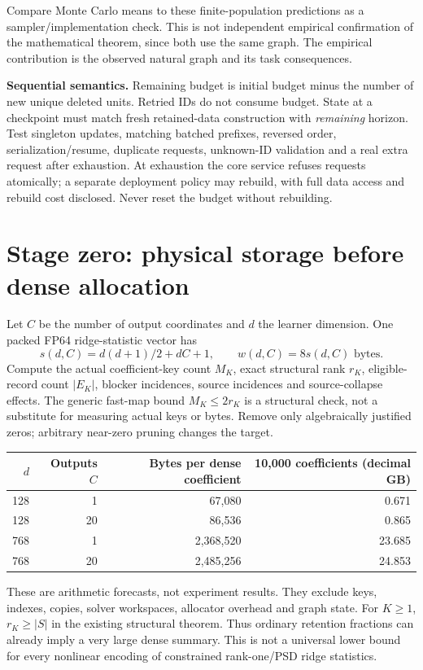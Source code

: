 \documentclass[11pt,a4paper]{article}
\newcommand{\smalltable}{\small\renewcommand{\arraystretch}{1.14}}
\begin{document}
Compare Monte Carlo means to these finite-population predictions as a sampler/implementation check. This is not independent empirical confirmation of the mathematical theorem, since both use the same graph. The empirical contribution is the observed natural graph and its task consequences.

\textbf{Sequential semantics.} Remaining budget is initial budget minus the number of new unique deleted units. Retried IDs do not consume budget. State at a checkpoint must match fresh retained-data construction with \emph{remaining} horizon. Test singleton updates, matching batched prefixes, reversed order, serialization/resume, duplicate requests, unknown-ID validation and a real extra request after exhaustion. At exhaustion the core service refuses requests atomically; a separate deployment policy may rebuild, with full data access and rebuild cost disclosed. Never reset the budget without rebuilding.

\section{Stage zero: physical storage before dense allocation}
Let $C$ be the number of output coordinates and $d$ the learner dimension. One packed FP64 ridge-statistic vector has
\[
 s(d,C)=d(d+1)/2+dC+1,\qquad w(d,C)=8s(d,C)\text{ bytes}.
\]
Compute the actual coefficient-key count $M_K$, exact structural rank $r_K$, eligible-record count $|E_K|$, blocker incidences, source incidences and source-collapse effects. The generic fast-map bound $M_K\le2r_K$ is a structural check, not a substitute for measuring actual keys or bytes. Remove only algebraically justified zeros; arbitrary near-zero pruning changes the target.

{\smalltable\begin{center}
\begin{tabular}{rrrr}
\toprule $d$ & Outputs $C$ & Bytes per dense coefficient & 10,000 coefficients (decimal GB)\\\midrule
128 & 1 & 67,080 & 0.671\\
128 & 20 & 86,536 & 0.865\\
768 & 1 & 2,368,520 & 23.685\\
768 & 20 & 2,485,256 & 24.853\\\bottomrule
\end{tabular}\end{center}}
These are arithmetic forecasts, not experiment results. They exclude keys, indexes, copies, solver workspaces, allocator overhead and graph state. For $K\ge1$, $r_K\ge |S|$ in the existing structural theorem. Thus ordinary retention fractions can already imply a very large dense summary. This is not a universal lower bound for every nonlinear encoding of constrained rank-one/PSD ridge statistics.
\end{document}
